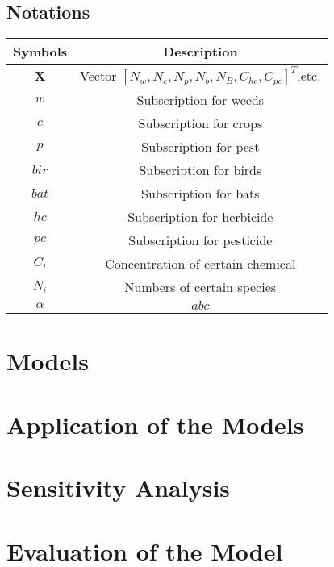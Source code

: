 \documentclass{HZNUMCM}
\begin{document}
        \subsection{Notations}
      \begin{table}[h]
        \centering
        \begin{tabular}{cc}
          \toprule
          \rowcolor{customcolor!40} %
          Symbols & Description\\
          \midrule
          $\mathbf{X}$ & Vector $[N_w,N_c,N_p,N_b,N_B,C_{hc},C_{pc}]^T$,etc. \\
          $w$ & Subscription for weeds \\
          $c$ & Subscription for crops \\
          $p$ & Subscription for pest \\
          $bir$ & Subscription for birds \\
          $bat$ & Subscription for bats \\
          $hc$ & Subscription for herbicide \\
          $pc$ & Subscription for pesticide \\
          $C_i$ & Concentration of certain chemical \\
          $N_i$ & Numbers of certain species \\
          $\alpha$ & $abc$ \\
          \bottomrule
        \end{tabular}
        \label{tab:example}
      \end{table}

  \section{Models}

  \section{Application of the Models}

  \section{Sensitivity Analysis}

  \section{Evaluation of the Model}
\end{document}
